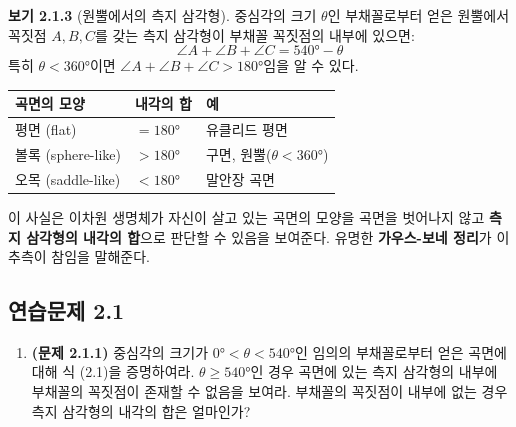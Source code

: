 \documentclass{article}
\begin{document}
\medskip
\textbf{보기 2.1.3} (원뿔에서의 측지 삼각형).\quad
중심각의 크기 $\theta$인 부채꼴로부터 얻은 원뿔에서
꼭짓점 $A, B, C$를 갖는 측지 삼각형이 부채꼴 꼭짓점의 내부에 있으면:
\[
  \angle A + \angle B + \angle C = 540° - \theta \tag{2.1}
\]
특히 $\theta < 360°$이면 $\angle A + \angle B + \angle C > 180°$임을 알 수 있다.

\begin{tcolorbox}[
  colback=teal!4, colframe=teal!65!black,
  title=핵심 결론: 내각의 합과 곡면의 모양,
  fonttitle=\bfseries, boxrule=0.5mm, arc=3mm]

\begin{center}
\renewcommand{\arraystretch}{1.3}
\begin{tabular}{|l|l|l|}
\hline
곡면의 모양 & 내각의 합 & 예 \\
\hline
평면 (flat) & $= 180°$ & 유클리드 평면 \\
볼록 (sphere-like) & $> 180°$ & 구면, 원뿔($\theta < 360°$) \\
오목 (saddle-like) & $< 180°$ & 말안장 곡면 \\
\hline
\end{tabular}
\end{center}

이 사실은 이차원 생명체가 자신이 살고 있는 곡면의 모양을
곡면을 벗어나지 않고 \textbf{측지 삼각형의 내각의 합}으로 판단할 수 있음을 보여준다.
유명한 \textbf{가우스-보네 정리}가 이 추측이 참임을 말해준다.

\end{tcolorbox}

\subsection*{연습문제 2.1}

\begin{enumerate}
  \item \textbf{(문제 2.1.1)}\quad
    중심각의 크기가 $0° < \theta < 540°$인 임의의 부채꼴로부터 얻은 곡면에 대해
    식 (2.1)을 증명하여라.
    $\theta \geq 540°$인 경우 곡면에 있는 측지 삼각형의 내부에 부채꼴의 꼭짓점이
    존재할 수 없음을 보여라.
    부채꼴의 꼭짓점이 내부에 없는 경우 측지 삼각형의 내각의 합은 얼마인가?
\end{enumerate}
\end{document}
